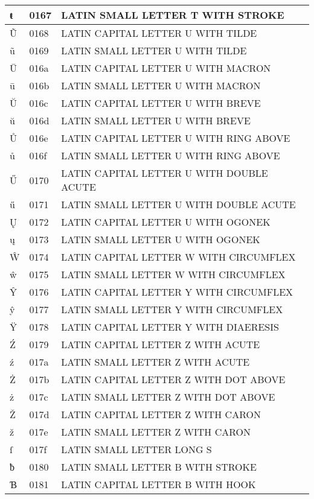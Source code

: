 \documentclass[12pt,letterpaper,openany]{book}
\begin{document}
\begin{center}
\begin{supertabular}{|m{0.25in}|m{0.5in}|m{4in}|}
			ŧ & 0167 & LATIN SMALL LETTER T WITH STROKE\\\hline
			Ũ & 0168 & LATIN CAPITAL LETTER U WITH TILDE\\\hline
			ũ & 0169 & LATIN SMALL LETTER U WITH TILDE\\\hline
			Ū & 016a & LATIN CAPITAL LETTER U WITH MACRON\\\hline
			ū & 016b & LATIN SMALL LETTER U WITH MACRON\\\hline
			Ŭ & 016c & LATIN CAPITAL LETTER U WITH BREVE\\\hline
			ŭ & 016d & LATIN SMALL LETTER U WITH BREVE\\\hline
			Ů & 016e & LATIN CAPITAL LETTER U WITH RING ABOVE\\\hline
			ů & 016f & LATIN SMALL LETTER U WITH RING ABOVE\\\hline
			Ű & 0170 & LATIN CAPITAL LETTER U WITH DOUBLE ACUTE\\\hline
			ű & 0171 & LATIN SMALL LETTER U WITH DOUBLE ACUTE\\\hline
			Ų & 0172 & LATIN CAPITAL LETTER U WITH OGONEK\\\hline
			ų & 0173 & LATIN SMALL LETTER U WITH OGONEK\\\hline
			Ŵ & 0174 & LATIN CAPITAL LETTER W WITH CIRCUMFLEX\\\hline
			ŵ & 0175 & LATIN SMALL LETTER W WITH CIRCUMFLEX\\\hline
			Ŷ & 0176 & LATIN CAPITAL LETTER Y WITH CIRCUMFLEX\\\hline
			ŷ & 0177 & LATIN SMALL LETTER Y WITH CIRCUMFLEX\\\hline
			Ÿ & 0178 & LATIN CAPITAL LETTER Y WITH DIAERESIS\\\hline
			Ź & 0179 & LATIN CAPITAL LETTER Z WITH ACUTE\\\hline
			ź & 017a & LATIN SMALL LETTER Z WITH ACUTE\\\hline
			Ż & 017b & LATIN CAPITAL LETTER Z WITH DOT ABOVE\\\hline
			ż & 017c & LATIN SMALL LETTER Z WITH DOT ABOVE\\\hline
			Ž & 017d & LATIN CAPITAL LETTER Z WITH CARON\\\hline
			ž & 017e & LATIN SMALL LETTER Z WITH CARON\\\hline
			ſ & 017f & LATIN SMALL LETTER LONG S\\\hline
			ƀ & 0180 & LATIN SMALL LETTER B WITH STROKE\\\hline
			Ɓ & 0181 & LATIN CAPITAL LETTER B WITH HOOK\\\hline

\end{supertabular}
\end{center}
\end{document}
